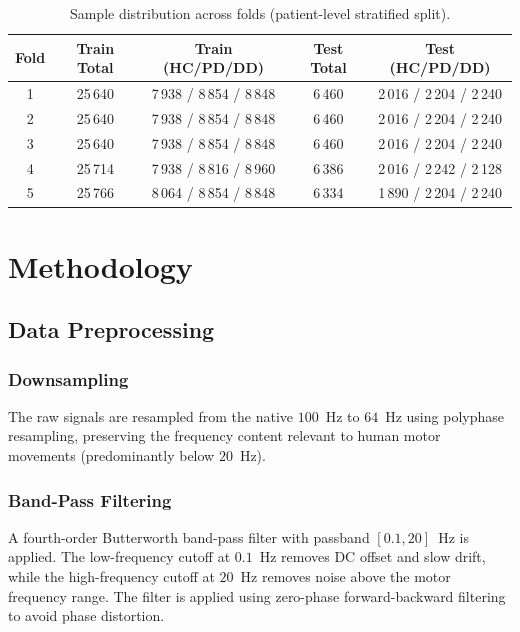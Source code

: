 \documentclass[conference]{IEEEtran}
\begin{document}
\begin{table}[H]
\centering
\caption{Sample distribution across folds (patient-level stratified split).}
\label{tab:folds}
\begin{tabular}{ccccc}
\toprule
\textbf{Fold} & \textbf{Train Total} & \textbf{Train (HC/PD/DD)} & \textbf{Test Total} & \textbf{Test (HC/PD/DD)} \\
\midrule
1 & 25\,640 & 7\,938 / 8\,854 / 8\,848 & 6\,460 & 2\,016 / 2\,204 / 2\,240 \\
2 & 25\,640 & 7\,938 / 8\,854 / 8\,848 & 6\,460 & 2\,016 / 2\,204 / 2\,240 \\
3 & 25\,640 & 7\,938 / 8\,854 / 8\,848 & 6\,460 & 2\,016 / 2\,204 / 2\,240 \\
4 & 25\,714 & 7\,938 / 8\,816 / 8\,960 & 6\,386 & 2\,016 / 2\,242 / 2\,128 \\
5 & 25\,766 & 8\,064 / 8\,854 / 8\,848 & 6\,334 & 1\,890 / 2\,204 / 2\,240 \\
\bottomrule
\end{tabular}
\end{table}

\section{Methodology}

\subsection{Data Preprocessing}

\subsubsection{Downsampling}
The raw signals are resampled from the native $100$~Hz to $64$~Hz using polyphase resampling, preserving the frequency content relevant to human motor movements (predominantly below $20$~Hz).

\subsubsection{Band-Pass Filtering}
A fourth-order Butterworth band-pass filter with passband $[0.1, 20]$~Hz is applied. The low-frequency cutoff at $0.1$~Hz removes DC offset and slow drift, while the high-frequency cutoff at $20$~Hz removes noise above the motor frequency range. The filter is applied using zero-phase forward-backward filtering to avoid phase distortion.
\end{document}
